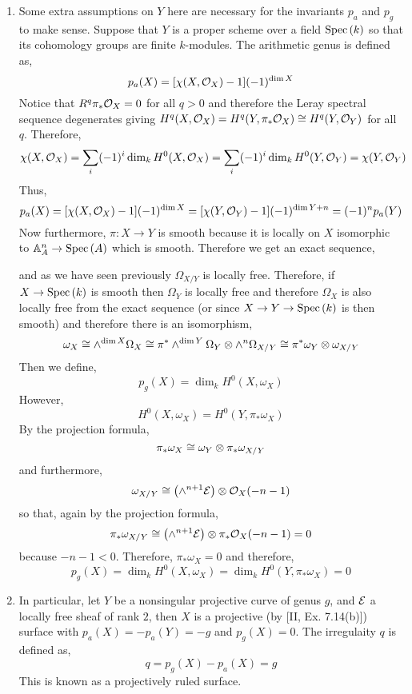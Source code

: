\documentclass[12pt]{article}
\begin{document}
\begin{enumerate}
\item Some extra assumptions on $Y$ here are necessary for the invariants $p_a$ and $p_g$ to make sense. Suppose that $Y$ is a proper scheme over a field $\mathrm{Spec}\left( k \right)$ so that its cohomology groups are finite $k$-modules. The arithmetic genus is defined as,
\[ p_a(X) = [ \chi(X, \mathcal{O}_{X}) - 1 ] (-1)^{\dim{X}} \]
Notice that $R^q \pi_* \mathcal{O}_{X} = 0$ for all $q > 0$ and therefore the Leray spectral sequence degenerates giving $H^q(X, \mathcal{O}_{X}) = H^q(Y, \pi_* \mathcal{O}_{X}) \cong H^q(Y, \mathcal{O}_{Y})$ for all $q$. Therefore, 
\[ \chi(X, \mathcal{O}_{X}) = \sum_{i} (-1)^i \dim_k H^0(X, \mathcal{O}_{X}) = \sum_i (-1)^i \dim_k H^0(Y, \mathcal{O}_{Y}) = \chi(Y, \mathcal{O}_{Y}) \]
Thus,
\[ p_a(X) = [ \chi(X, \mathcal{O}_{X}) - 1 ] (-1)^{\dim{X}} = [ \chi(Y, \mathcal{O}_{Y}) - 1](-1)^{\dim{Y} + n} = (-1)^n p_a(Y) \]
Now furthermore, $\pi : X \to Y$ is smooth because it is locally on $X$ isomorphic to $\mathbb{A}^n_A \to \mathrm{Spec}\left( A \right)$ which is smooth. Therefore we get an exact sequence,
\begin{center}
\end{center}
and as we have seen previously $\Omega_{X/Y}$ is locally free. Therefore, if $X \to \mathrm{Spec}\left( k \right)$ is smooth then $\Omega_Y$ is locally free and therefore $\Omega_X$ is also locally free from the exact sequence (or since $X \to Y \to \mathrm{Spec}\left( k \right)$ is then smooth) and therefore there is an isomorphism,
\[ \omega_X \cong \wedge^{\dim{X}} \Omega_X \cong \pi^* \wedge^{\dim{Y}} \Omega_Y \otimes \wedge^{n} \Omega_{X/Y} \cong \pi^* \omega_Y \otimes \omega_{X/Y} \]
Then we define,
\[ p_g(X) = \dim_k H^0(X, \omega_X) \]
However, 
\[ H^0(X, \omega_X) = H^0(Y, \pi_* \omega_X) \]
By the projection formula,
\[ \pi_* \omega_X \cong \omega_Y \otimes \pi_* \omega_{X/Y} \]
and furthermore,
\[ \omega_{X/Y} \cong \left( \wedge^{n+1} \mathcal{E} \right) \otimes \mathcal{O}_{X}(-n-1) \]
so that, again by the projection formula,
\[ \pi_* \omega_{X/Y} \cong \left( \wedge^{n+1} \mathcal{E} \right) \otimes \pi_* \mathcal{O}_{X}(-n-1) = 0 \]
because $-n -1 < 0$. Therefore, $\pi_* \omega_X = 0$ and therefore,
\[ p_g(X) = \dim_k H^0(X, \omega_X) = \dim_k H^0(Y, \pi_* \omega_X) = 0 \]

\item In particular, let $Y$ be a nonsingular projective curve of genus $g$, and $\mathcal{E}$ a locally free sheaf of rank $2$, then $X$ is a projective (by [II, Ex. 7.14(b)]) surface with $p_a(X) = -p_a(Y) = -g$ and $p_g(X) = 0$. The irregulaity $q$ is defined as,
\[ q = p_g(X) - p_a(X) = g \]
This is known as a projectively ruled surface.
\end{enumerate}
\end{document}
